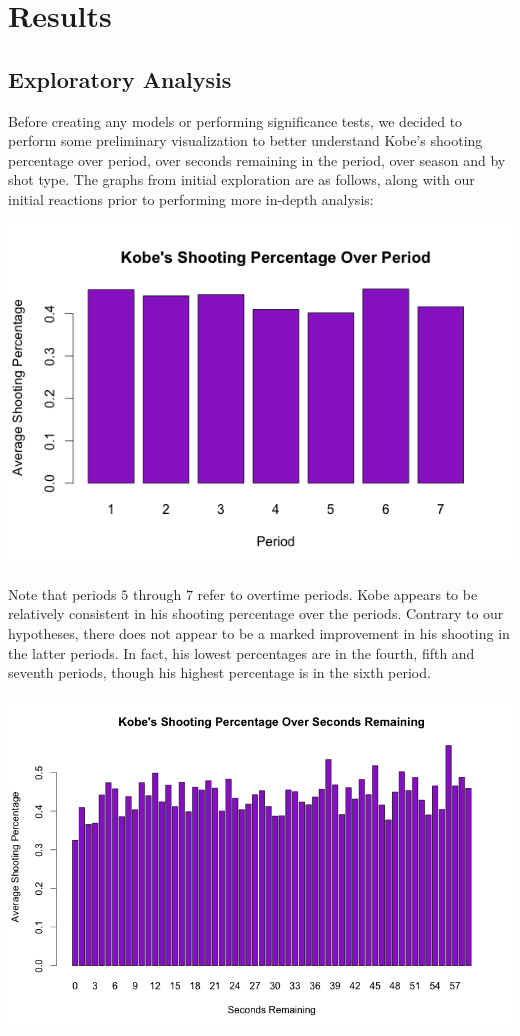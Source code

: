 \documentclass[paper=a4, fontsize=11pt]{scrartcl} %
\numberwithin{equation}{section} %
\numberwithin{figure}{section} %
\numberwithin{table}{section} %
\begin{document}
\section{Results}
\subsection{Exploratory Analysis}
Before creating any models or performing significance tests, we decided to perform some preliminary visualization to better understand Kobe's shooting percentage over period, over seconds remaining in the period, over season and by shot type. The graphs from initial exploration are as follows, along with our initial reactions prior to performing more in-depth analysis:
\begin{center}
	\includegraphics[width=14cm]{img/period}
\end{center}
Note that periods $5$ through $7$ refer to overtime periods. Kobe appears to be relatively consistent in his shooting percentage over the periods. Contrary to our hypotheses, there does not appear to be a marked improvement in his shooting in the latter periods. In fact, his lowest percentages are in the fourth, fifth and seventh periods, though his highest percentage is in the sixth period.  
\begin{center}
	\includegraphics[width=14cm]{img/seconds}
\end{center}
\end{document}
